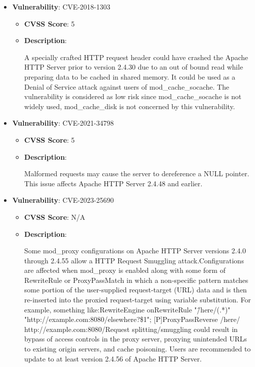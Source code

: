 \documentclass{article}
\begin{document}
\begin{itemize}
        \item \textbf{Vulnerability}: CVE-2018-1303
        \begin{itemize}
            \item \textbf{CVSS Score}:  5 
            \item \textbf{Description}:
            \parbox[t]{0.9\linewidth}{
                \ttfamily A specially crafted HTTP request header could have crashed the Apache HTTP Server prior to version 2.4.30 due to an out of bound read while preparing data to be cached in shared memory. It could be used as a Denial of Service attack against users of mod\_cache\_socache. The vulnerability is considered as low risk since mod\_cache\_socache is not widely used, mod\_cache\_disk is not concerned by this vulnerability.
            }
        \end{itemize}
    
        \item \textbf{Vulnerability}: CVE-2021-34798
        \begin{itemize}
            \item \textbf{CVSS Score}:  5 
            \item \textbf{Description}:
            \parbox[t]{0.9\linewidth}{
                \ttfamily Malformed requests may cause the server to dereference a NULL pointer. This issue affects Apache HTTP Server 2.4.48 and earlier.
            }
        \end{itemize}
    
        \item \textbf{Vulnerability}: CVE-2023-25690
        \begin{itemize}
            \item \textbf{CVSS Score}:  N/A 
            \item \textbf{Description}:
            \parbox[t]{0.9\linewidth}{
                \ttfamily Some mod\_proxy configurations on Apache HTTP Server versions 2.4.0 through 2.4.55 allow a HTTP Request Smuggling attack.Configurations are affected when mod\_proxy is enabled along with some form of RewriteRule or ProxyPassMatch in which a non-specific pattern matches some portion of the user-supplied request-target (URL) data and is then re-inserted into the proxied request-target using variable substitution. For example, something like:RewriteEngine onRewriteRule "\^/here/(.*)" "http://example.com:8080/elsewhere?\$1"; [P]ProxyPassReverse /here/ http://example.com:8080/Request splitting/smuggling could result in bypass of access controls in the proxy server, proxying unintended URLs to existing origin servers, and cache poisoning. Users are recommended to update to at least version 2.4.56 of Apache HTTP Server.
            }
        \end{itemize}
    

\end{itemize}
\end{document}
